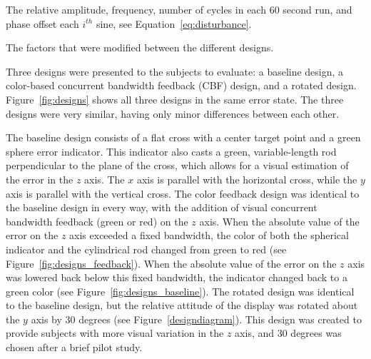 \begin{table}[tb]
    \centering
    \caption[Disturbance force characteristics]{The relative amplitude, frequency, number of cycles in each 60 second run, and phase offset each $i^{th}$ sine, see Equation~\ref{eq:disturbance}.}
    \label{sine-table}
\end{table}

\begin{table}[tb]
    \centering
    \caption[The factors that were modified between the different designs]{The factors that were modified between the different designs.}
    \label{tab:designs}
\end{table}

Three designs were presented to the subjects to evaluate: a baseline design, a color-based concurrent bandwidth feedback (CBF) design, and a rotated design.
Figure~\ref{fig:designs} shows all three designs in the same error state.
The three designs were very similar, having only minor differences between each other.

The baseline design consists of a flat cross with a center target point and a green sphere error indicator.
This indicator also casts a green, variable-length rod perpendicular to the plane of the cross, which allows for a visual estimation of the error in the $z$ axis.
The $x$ axis is parallel with the horizontal cross, while the $y$ axis is parallel with the vertical cross.
The color feedback design was identical to the baseline design in every way, with the addition of visual concurrent bandwidth feedback (green or red) on the $z$ axis.
When the absolute value of the error on the $z$ axis exceeded a fixed bandwidth, the color of both the spherical indicator and the cylindrical rod changed from green to red (see Figure~\ref{fig:designs_feedback}).
When the absolute value of the error on the $z$ axis was lowered back below this fixed bandwidth, the indicator changed back to a green color (see Figure~\ref{fig:designs_baseline}).
The rotated design was identical to the baseline design, but the relative attitude of the display was rotated about the $y$ axis by 30 degrees (see Figure~\ref{designdiagram}).
This design was created to provide subjects with more visual variation in the $z$ axis, and 30 degrees was chosen after a brief pilot study.

